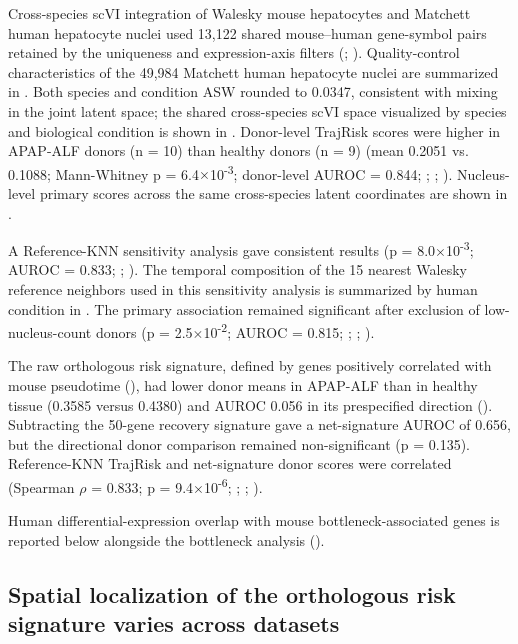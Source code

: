 Cross-species scVI integration of Walesky mouse hepatocytes and Matchett human hepatocyte nuclei used 13,122 shared mouse--human gene-symbol pairs retained by the uniqueness and expression-axis filters (; ). Quality-control characteristics of the 49,984 Matchett human hepatocyte nuclei are summarized in . Both species and condition ASW rounded to 0.0347, consistent with mixing in the joint latent space; the shared cross-species scVI space visualized by species and biological condition is shown in . Donor-level \SelfOnly{} TrajRisk scores were higher in APAP-ALF donors (n = 10) than healthy donors (n = 9) (mean 0.2051 vs. 0.1088; Mann-Whitney p = 6.4\ensuremath{\times}10\textsuperscript{-3}; donor-level AUROC = 0.844; ; ; ). Nucleus-level primary \SelfOnly{} scores across the same cross-species latent coordinates are shown in .

A Reference-KNN sensitivity analysis gave consistent results (p = 8.0\ensuremath{\times}10\textsuperscript{-3}; AUROC = 0.833; ; ). The temporal composition of the 15 nearest Walesky reference neighbors used in this sensitivity analysis is summarized by human condition in . The primary \SelfOnly{} association remained significant after exclusion of low-nucleus-count donors (p = 2.5\ensuremath{\times}10\textsuperscript{-2}; AUROC = 0.815; ; ; ).

The raw orthologous risk signature, defined by genes positively correlated with mouse pseudotime (), had lower donor means in APAP-ALF than in healthy tissue (0.3585 versus 0.4380) and AUROC 0.056 in its prespecified direction (). Subtracting the 50-gene recovery signature gave a net-signature AUROC of 0.656, but the directional donor comparison remained non-significant (p = 0.135). Reference-KNN TrajRisk and net-signature donor scores were correlated (Spearman \ensuremath{\rho} = 0.833; p = 9.4\ensuremath{\times}10\textsuperscript{-6}; ; ; ).

Human differential-expression overlap with mouse bottleneck-associated genes is reported below alongside the bottleneck analysis ().


\subsection*{Spatial localization of the orthologous risk signature varies across datasets}

